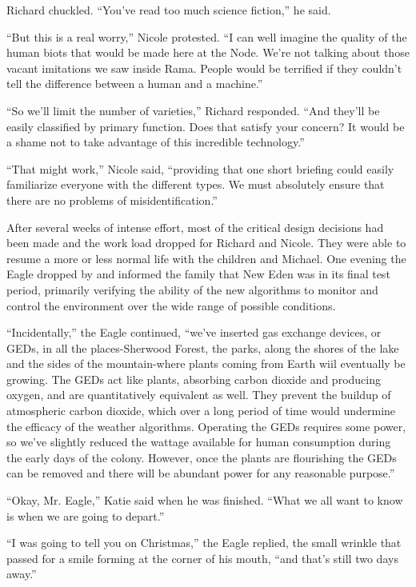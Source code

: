 \documentclass[]{article}
\begin{document}
{Richard chuckled.  “You’ve read too much science fiction,” he said.

“But this is a real worry,” Nicole protested.  “I can well imagine the quality of the human biots that would be made here at the Node.  We’re not talking about those vacant imitations we saw inside Rama.  People would be terrified if they couldn’t tell the difference between a human and a machine.”

“So we’ll limit the number of varieties,” Richard responded.  “And they’ll be easily classified by primary function.  Does that satisfy your concern? It would be a shame not to take advantage of this incredible technology.”

“That might work,” Nicole said, “providing that one short briefing could easily familiarize everyone with the different types.  We must absolutely ensure that there are no problems of misidentification.”

After several weeks of intense effort, most of the critical design decisions had been made and the work load dropped for Richard and Nicole.  They were able to resume a more or less normal life with the children and Michael.  One evening the Eagle dropped by and informed the family that New Eden was in its final test period, primarily verifying the ability of the new algorithms to monitor and control the environment over the wide range of possible conditions.

“Incidentally,” the Eagle continued, “we’ve inserted gas exchange devices, or GEDs, in all the places-Sherwood Forest, the parks, along the shores of the lake and the sides of the mountain-where plants coming from Earth wiil eventually be growing.  The GEDs act like plants, absorbing carbon dioxide and producing oxygen, and are quantitatively equivalent as well.  They prevent the buildup of atmospheric carbon dioxide, which over a long period of time would undermine the efficacy of the weather algorithms.  Operating the GEDs requires some power, so we’ve slightly reduced the wattage available for human consumption during the early days of the colony.  However, once the plants are flourishing the GEDs can be removed and there will be abundant power for any reasonable purpose.”

“Okay, Mr.  Eagle,” Katie said when he was finished.  “What we all want to know is when we are going to depart.”

“I was going to tell you on Christmas,” the Eagle replied, the small wrinkle that passed for a smile forming at the corner of his mouth, “and that’s still two days away.”

}
\end{document}

